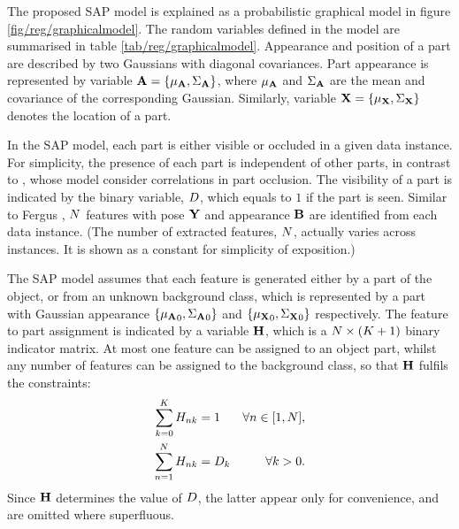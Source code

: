 The proposed SAP model is explained as a probabilistic graphical model in figure \ref{fig/reg/graphicalmodel}. 
The random variables defined in the model are summarised in table \ref{tab/reg/graphicalmodel}.
Appearance and position of a part are described by two Gaussians with diagonal covariances. Part appearance is represented by variable $\mathbf{A}=\{{\mu_{\mathbf{A}}},{\Sigma_{\mathbf{A}}}\}$, where ${\mu_{\mathbf{A}}}$ and ${\Sigma_{\mathbf{A}}}$ are the mean and covariance of the corresponding Gaussian. Similarly, variable $\mathbf{X}=\{{\mu_{\mathbf{X}}},{\Sigma_{\mathbf{X}}}\}$ denotes the location of a part. 

In the SAP model, each part is either visible or occluded in a given data instance.   
For simplicity, the presence of each part is independent of other parts, in contrast to \cite{Fergus2007, Weber2000}, whose model consider correlations in part occlusion. 
The visibility of a part is indicated by the binary variable, ${D}$, which equals to $1$ if the part is seen. Similar to Fergus \etal \cite{Fergus2007}, $N$ features with pose $\mathbf{Y}$ and appearance $\mathbf{B}$ are identified from each data instance. (The number of extracted features, $N$, actually varies across instances. It is shown as a constant for simplicity of exposition.)  

The SAP model assumes that each feature is generated either by a part of the object, or from an unknown background class, which is represented by a part with Gaussian appearance $\{{\mu_{\mathbf{A}}}_0, {\Sigma_{\mathbf{A}}}_0\}$ and $\{{\mu_{\mathbf{X}}}_0, {\Sigma_{\mathbf{X}}}_0\}$ respectively. 
The feature to part assignment is indicated by a variable $\mathbf{H}$, which is a $N \times (K + 1)$ binary indicator matrix. 
At most one feature can be assigned to an object part, whilst any number of features can be assigned to the background class, so that $\mathbf{H}$ fulfils the constraints: 
\begin{equation}
	\begin{aligned}
		\sum_{k = 0}^{K}{H}_{nk}& =1 & \forall n \in [1, N], \\ 
		\sum_{n = 1}^{N}{H}_{nk}& ={D}_k & \forall k>0.
	\end{aligned} 
\end{equation}
Since $\mathbf{H}$ determines the value of ${D}$, the latter appear only for convenience, and are omitted where superfluous. 

